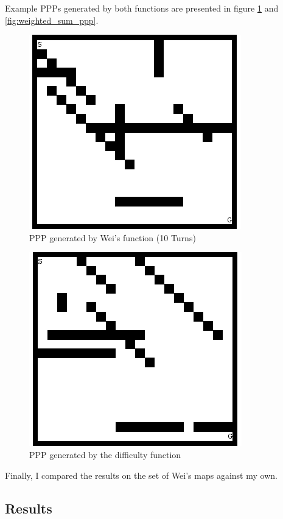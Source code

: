 \documentclass[authoryearcitations]{UoYCSproject}
\begin{document}
Example PPPs generated by both functions are presented in figure \ref{fig:wei_ppp} and \ref{fig:weighted_sum_ppp}.

\begin{figure}
\graphicspath{ {EvalPics/} }
\includegraphics[scale=0.65]{wei_26.png}
\caption{PPP generated by Wei's function (10 Turns)}
\label{fig:wei_ppp}
\end{figure}

\begin{figure}
\graphicspath{ {EvalPics/} }
\includegraphics[scale=0.65]{openh_46.png}
\caption{PPP generated by the difficulty function}
\label{fig:difficulty_ppp}
\end{figure}

Finally, I compared the results on the set of Wei's maps against my own.

\subsection{Results}
\label{sec:gen_eval_results}
\end{document}
